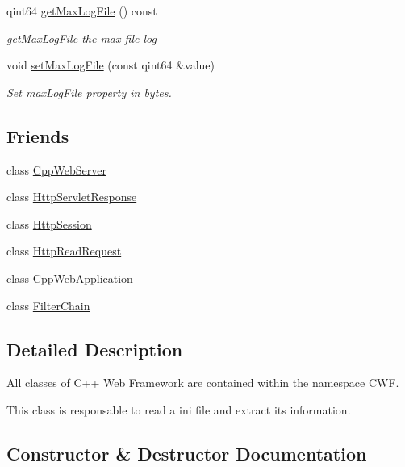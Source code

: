 \begin{DoxyCompactItemize}
qint64 \hyperlink{class_configuration_a05ee88466fbe346175ec6420b6857b98}{get\+Max\+Log\+File} () const
\begin{DoxyCompactList}\small\item\em get\+Max\+Log\+File the max file log \end{DoxyCompactList}\item 
void \hyperlink{class_configuration_a3c26bb11f458d7374fd4c5b53e181aee}{set\+Max\+Log\+File} (const qint64 \&value)
\begin{DoxyCompactList}\small\item\em Set max\+Log\+File property in bytes. \end{DoxyCompactList}\end{DoxyCompactItemize}
\subsection*{Friends}
\begin{DoxyCompactItemize}
\item 
class \hyperlink{class_configuration_af35951d3389bacc3d625fc73174f7364}{Cpp\+Web\+Server}
\item 
class \hyperlink{class_configuration_a84765570a5386c96f10067fb0e11bc13}{Http\+Servlet\+Response}
\item 
class \hyperlink{class_configuration_a3e611175a551b64dda26f513067e0d04}{Http\+Session}
\item 
class \hyperlink{class_configuration_a4d54f5003e07e218070a449c22a52c7c}{Http\+Read\+Request}
\item 
class \hyperlink{class_configuration_af79af37b83b26f7eeb57dcb953a09845}{Cpp\+Web\+Application}
\item 
class \hyperlink{class_configuration_a14d4dda0e6f3fa404ebad6cc84ab5ca6}{Filter\+Chain}
\end{DoxyCompactItemize}


\subsection{Detailed Description}
All classes of C++ Web Framework are contained within the namespace C\+WF. 

This class is responsable to read a ini file and extract its information. 

\subsection{Constructor \& Destructor Documentation}
\mbox{\label{class_configuration_af5d72b2e949b80b291b1013268cff405}} 
